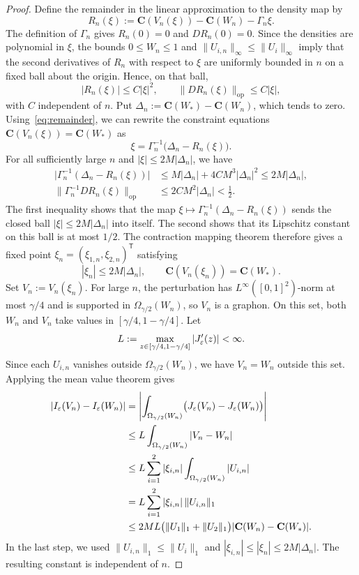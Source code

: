 \begin{proof}
Define the remainder in the linear approximation to the density map by
\begin{equation}\label{eq:remainder}
  R_n(\xi):=\mathbf C(V_n(\xi))-\mathbf C(W_n)-\Gamma_n\xi.
\end{equation}
The definition of $\Gamma_n$ gives $R_n(0)=0$ and $DR_n(0)=0$.
Since the densities are polynomial in $\xi$, the bounds $0\le W_n\le1$
and $\|U_{i,n}\|_\infty\le\|U_i\|_\infty$ imply that the second
derivatives of $R_n$ with respect to $\xi$ are uniformly bounded in $n$
on a fixed ball about the origin.
Hence, on that ball,
\[
  |R_n(\xi)|\le C|\xi|^2,\qquad \|DR_n(\xi)\|_{\mathrm{op}}\le C|\xi|,
\]
with $C$ independent of $n$.  Put
$\Delta_n:=\mathbf C(W_*)-\mathbf C(W_n)$, which tends to zero.
Using~\eqref{eq:remainder}, we can rewrite the constraint equations
$\mathbf C(V_n(\xi))=\mathbf C(W_*)$ as
\[
  \xi=\Gamma_n^{-1}\bigl(\Delta_n-R_n(\xi)\bigr).
\]
For all sufficiently large $n$ and $|\xi|\le2M|\Delta_n|$, we have
\begin{align*}
  \bigl|\Gamma_n^{-1}(\Delta_n-R_n(\xi))\bigr|
  &\le M|\Delta_n|+4CM^3|\Delta_n|^2\le2M|\Delta_n|,\\
  \|\Gamma_n^{-1}DR_n(\xi)\|_{\mathrm{op}}
  &\le2CM^2|\Delta_n|<\tfrac12.
\end{align*}
The first inequality shows that the map
$\xi\mapsto\Gamma_n^{-1}(\Delta_n-R_n(\xi))$ sends the closed ball
$|\xi|\le2M|\Delta_n|$ into itself. The second shows that its Lipschitz
constant on this ball is at most $1/2$. The contraction mapping theorem
therefore gives a fixed point $\xi_n=(\xi_{1,n},\xi_{2,n})^{\mathsf T}$ satisfying
\[
  |\xi_n|\le2M|\Delta_n|,\qquad
  \mathbf C(V_n(\xi_n))=\mathbf C(W_*).
\]
Set $V_n:=V_n(\xi_n)$.
For large $n$, the perturbation has $L^\infty([0,1]^2)$-norm at most
$\gamma/4$ and is supported in $\Omega_{\gamma/2}(W_n)$, so $V_n$ is a graphon.
On this set, both $W_n$ and $V_n$ take values in $[\gamma/4,1-\gamma/4]$.
Let
\[
  L:=\max_{z\in[\gamma/4,1-\gamma/4]}|J_\varepsilon'(z)|<\infty.
\]
Since each $U_{i,n}$ vanishes outside $\Omega_{\gamma/2}(W_n)$, we have
$V_n=W_n$ outside this set. Applying the mean value theorem gives
\begin{align*}
  |I_\varepsilon(V_n)-I_\varepsilon(W_n)|
  &=\left|\int_{\Omega_{\gamma/2}(W_n)}
    \bigl(J_\varepsilon(V_n)-J_\varepsilon(W_n)\bigr)\right|\\
  &\le L\int_{\Omega_{\gamma/2}(W_n)}|V_n-W_n|\\
  &\le L\sum_{i=1}^2|\xi_{i,n}|
    \int_{\Omega_{\gamma/2}(W_n)}|U_{i,n}|\\
  &=L\sum_{i=1}^2|\xi_{i,n}|\,\|U_{i,n}\|_1\\
  &\le2ML\bigl(\|U_1\|_1+\|U_2\|_1\bigr)
    |\mathbf C(W_n)-\mathbf C(W_*)|.
\end{align*}
In the last step, we used $\|U_{i,n}\|_1\le\|U_i\|_1$ and
$|\xi_{i,n}|\le|\xi_n|\le2M|\Delta_n|$.
The resulting constant is independent of $n$.
\end{proof}

